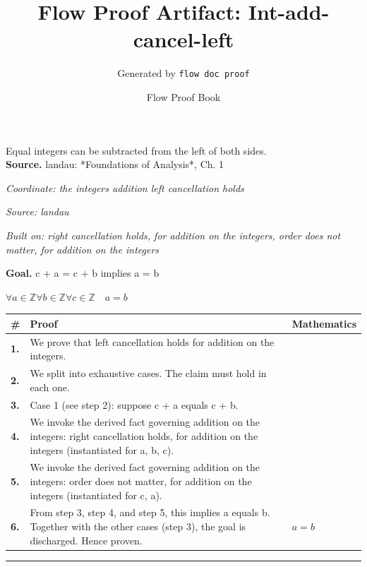 \documentclass[11pt]{article}
\title{Flow Proof Artifact: Int-add-cancel-left}
\author{Generated by \texttt{flow doc proof}}
\date{Flow Proof Book}
\theoremstyle{definition}
\begin{document}
\maketitle
Equal integers can be subtracted from the left of both sides.\\[0.5em]
\textbf{Source.} landau: *Foundations of Analysis*, Ch. 1\\[0.5em]
\bigskip
{}\par
\smallskip\noindent\textit{Coordinate: the integers \cdot addition \cdot left cancellation holds}\par
\smallskip\noindent\textit{Source: landau}\par
\smallskip\noindent\textit{Built on: right cancellation holds, for addition on the integers, order does not matter, for addition on the integers}\par
\medskip
\noindent\textbf{Goal.} c + a = c + b implies a = b\par
\noindent$\displaystyle \forall a \in \mathbb{Z} \forall b \in \mathbb{Z} \forall c \in \mathbb{Z}\quad a = b$\par
\medskip
\noindent
\begin{tabular}{@{} >{\raggedright\arraybackslash}p{} >{\raggedright\arraybackslash}p{} >{\raggedleft\arraybackslash}p{} @{}}
\textbf{\#} & \textbf{Proof} & \textbf{Mathematics} \\
\midrule
\textbf{1.} & We prove that left cancellation holds for addition on the integers. & \\[0.45em]
\textbf{2.} & We split into exhaustive cases. The claim must hold in each one. & \\[0.45em]
\textbf{3.} & Case 1 (see step 2): suppose c + a  equals  c + b. & \\[0.45em]
\textbf{4.} & We invoke the derived fact governing addition on the integers: right cancellation holds, for addition on the integers (instantiated for a, b, c). & \\[0.45em]
\textbf{5.} & We invoke the derived fact governing addition on the integers: order does not matter, for addition on the integers (instantiated for c, a). & \\[0.45em]
\textbf{6.} & From step 3, step 4, and step 5, this implies a equals b. Together with the other cases (step 3), the goal is discharged. Hence proven. & $\displaystyle a = b$ \\[0.45em]
\bottomrule
\end{tabular}
\label{thm:Int-addition-left_cancellation_holds}
\par\medskip\hrule
\end{document}
